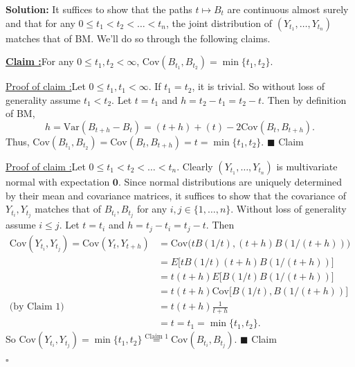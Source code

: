 \documentclass[12pt]{article}
\newcounter{ProofCounter}
\newcounter{ClaimCounter}[ProofCounter]
\newenvironment{Solution}{\stepcounter{ProofCounter}\textbf{Solution:}}{\hfill$\square$}
\newenvironment{claim}[1]{\vspace{1mm}\stepcounter{ClaimCounter}\par\noindent\underline{\bf Claim \theClaimCounter:}\space#1}{}
\newenvironment{claimproof}[1]{\par\noindent\underline{Proof of claim \theClaimCounter:}\space#1}{\hfill $\blacksquare$ Claim \theClaimCounter \\}
\begin{document}
\begin{Solution}
  It suffices to show that the paths $t \mapsto B_t$ are continuous almost surely and that for any $0 \leq t_1 < t_2 < \dots < t_n$, the joint distribution of $(Y_{t_1}, \dots, Y_{t_n})$ matches that of BM. We'll do so through the following claims.

  \begin{claim}
    For any $0 \leq t_1, t_2 < \infty$, $\text{Cov}(B_{t_1}, B_{t_2}) = \min\{t_1, t_2\}$.
  \end{claim}
  \begin{claimproof}
    Let $0 \leq t_1, t_1 < \infty$. If $t_1 = t_2$, it is trivial. So without loss of generality assume $t_1 < t_2$. Let $t = t_1$ and $h = t_2 - t_1 = t_2 - t$. Then by definition of BM,
    \[
      h = \text{Var}(B_{t+h} - B_t) = (t + h) + (t) - 2\text{Cov}(B_t, B_{t+h}).
    \]
    Thus, $\text{Cov}(B_{t_1}, B_{t_2}) = \text{Cov}(B_t, B_{t+h}) = t = \min\{t_1, t_2\}$.
  \end{claimproof}

  \begin{claimproof}
    Let $0 \leq t_1 < t_2 < \dots < t_n$. Clearly $(Y_{t_1}, \dots, Y_{t_n})$ is multivariate normal with expectation $\bm{0}$. Since normal distributions are uniquely determined by their mean and covariance matrices, it suffices to show that the covariance of $Y_{t_i}, Y_{t_j}$ matches that of $B_{t_i}, B_{t_j}$ for any $i, j \in \{1, \dots, n\}$. Without loss of generality assume $i \leq j$. Let $t = t_i$ and $h = t_j - t_i = t_j - t$. Then
    \begin{align*}
      \text{Cov}(Y_{t_i}, Y_{t_j}) = \text{Cov}(Y_t, Y_{t+h}) & = \text{Cov}\bigg(tB(1/t), (t+h)B(1/(t+h))\bigg) \\
      & = E\bigg[tB(1/t)(t+h)B(1/(t+h))\bigg] \\
      & = t(t+h) E\bigg[ B(1/t)B(1/(t+h)) \bigg] \\
      & = t(t+h) \text{Cov}\bigg[ B(1/t),B(1/(t+h)) \bigg] \\
      \text{(by Claim 1)} \ \ \ \ & = t(t+h)\frac{1}{t+h} \\
      & = t = t_1 = \min\{t_1, t_2\}.
    \end{align*}
    So $\text{Cov}(Y_{t_i}, Y_{t_j}) = \min\{t_1, t_2\} \stackrel{\text{Claim 1}}{=} \text{Cov}(B_{t_i}, B_{t_j})$.
  \end{claimproof}


\end{Solution}
\end{document}
